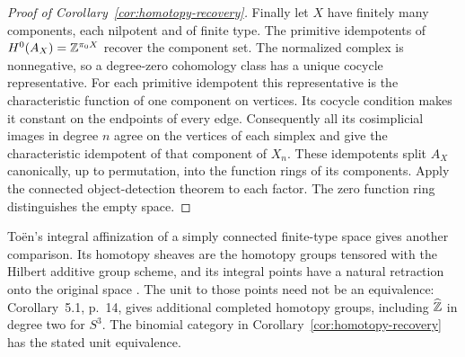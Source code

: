 \begin{proof}[Proof of Corollary~\ref{cor:homotopy-recovery}]
Finally let $X$ have finitely many components, each nilpotent and
of finite type. The primitive idempotents of
$H^0(A_X)=\mathbb Z^{\pi_0X}$ recover the component set. The normalized
complex is nonnegative, so a degree-zero cohomology class has a
unique cocycle representative. For each primitive idempotent this
representative is the characteristic function of one component on
vertices. Its cocycle condition makes it constant on the endpoints
of every edge. Consequently all its cosimplicial images in degree
$n$ agree on the vertices of each simplex and give the characteristic
idempotent of that component of $X_n$. These idempotents split
$A_X$ canonically, up to permutation, into the function rings of its
components. Apply the connected object-detection theorem to each
factor. The zero function ring distinguishes the empty space.
\end{proof}


To\"en's integral affinization of a simply connected finite-type
space gives another comparison. Its homotopy sheaves are the homotopy
groups tensored with the Hilbert additive group scheme, and its
integral points have a natural retraction onto the original space
\cite[Theorem~4.1, p.~11; Corollaries~5.4--5.5, pp.~16--17]{Toen}.
The unit to those points need not be an equivalence: Corollary~5.1,
p.~14, gives additional completed homotopy groups, including
$\widehat{\mathbb Z}$ in degree two for $S^3$. The binomial category in
Corollary~\ref{cor:homotopy-recovery} has the stated unit equivalence.
